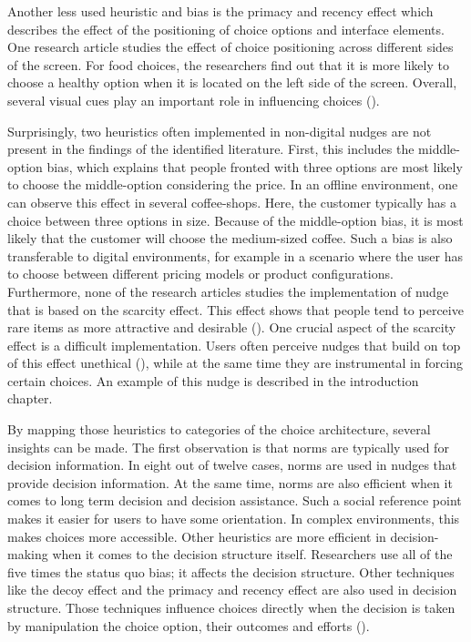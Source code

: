 Another less used heuristic and bias is the primacy and recency effect which describes the effect of the positioning of choice options and interface elements. One research article studies the effect of choice positioning across different sides of the screen. For food choices, the researchers find out that it is more likely to choose a healthy option when it is located on the left side of the screen. Overall, several visual cues play an important role in influencing choices (\cite{romero_healthy-left_2016}).

Surprisingly, two heuristics often implemented in non-digital nudges are not present in the findings of the identified literature. First, this includes the middle-option bias, which explains that people fronted with three options are most likely to choose the middle-option considering the price. In an offline environment, one can observe this effect in several coffee-shops. Here, the customer typically has a choice between three options in size. Because of the middle-option bias, it is most likely that the customer will choose the medium-sized coffee. Such a bias is also transferable to digital environments, for example in a scenario where the user has to choose between different pricing models or product configurations. 
Furthermore, none of the research articles studies the implementation of nudge that is based on the scarcity effect. This effect shows that people tend to perceive rare items as more attractive and desirable (\cite{gergen_search_1980}). One crucial aspect of the scarcity effect is a difficult implementation. Users often perceive nudges that build on top of this effect unethical (\cite{sunstein_nudging_2015}), while at the same time they are instrumental in forcing certain choices. An example of this nudge is described in the introduction chapter.

By mapping those heuristics to categories of the choice architecture, several insights can be made. The first observation is that norms are typically used for decision information. In eight out of twelve cases, norms are used in nudges that provide decision information. At the same time, norms are also efficient when it comes to long term decision and decision assistance. Such a social reference point makes it easier for users to have some orientation. In complex environments, this makes choices more accessible. 
Other heuristics are more efficient in decision-making when it comes to the decision structure itself. Researchers use all of the five times the status quo bias; it affects the decision structure.
Other techniques like the decoy effect and the primacy and recency effect are also used in decision structure. Those techniques influence choices directly when the decision is taken by manipulation the choice option, their outcomes and efforts (\cite{munscher_review_2016}).


